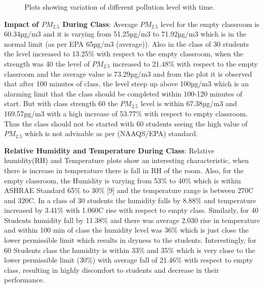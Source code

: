 \begin{figure}
	\hfill	
	\hfill
	\caption{Plots showing variation of different pollution level with time.}
\end{figure}

\textbf{Impact of $PM_{2.5}$ During Class}: Average $PM_{2.5}$ level for the empty classroom is 60.34µg/m3 and it is varying from 51.25µg/m3 to 71.92µg/m3 which is in the normal limit (as per EPA 65µg/m3 (average)). Also in the class of 30 students the level increased to 13.25\% with respect to the empty classroom, when the strength was 40 the level of $PM_{2.5}$ increased to 21.48\% with respect to the empty classroom and the average value is 73.29µg/m3 and from the plot it is observed that after 100 minutes of class, the level steep up above 100µg/m3 which is an alarming limit that the class should be completed within 100-120 minutes of start. But with class strength 60 the $PM_{2.5}$ level is within 67.38µg/m3 and 169.57µg/m3 with a high increase of 53.77\% with respect to empty classroom. Thus the class should not be started with 60 students seeing the high value of $PM_{2.5}$ which is not advisable as per (NAAQS/EPA) standard.


\textbf{Relative Humidity and Temperature During Class}: Relative humidity(RH) and Temperature plots show an interesting characteristic, when there is increase in temperature there is fall in RH of the room. Also, for the empty classroom, the Humidity is varying from 53\% to 40\% which is within ASHRAE Standard 65\% to 30\% [9] and the temperature range is between 270C and 320C. In a class of 30 students the humidity falls by 8.88\% and temperature increased by 3.41\% with 1.060C rise with respect to empty class. Similarly, for 40 Students humidity fall by 11.38\% and there was average 2.030 rise in temperature and within 100 min of class the humidity level was 36\% which is just close the lower permissible limit which results in dryness to the students. Interestingly, for 60 Students class the humidity is within 33\% and 35\% which is very close to the lower permissible limit (30\%) with average fall of 21.46\% with respect to empty class, resulting in highly discomfort to students and decrease in their performance.




